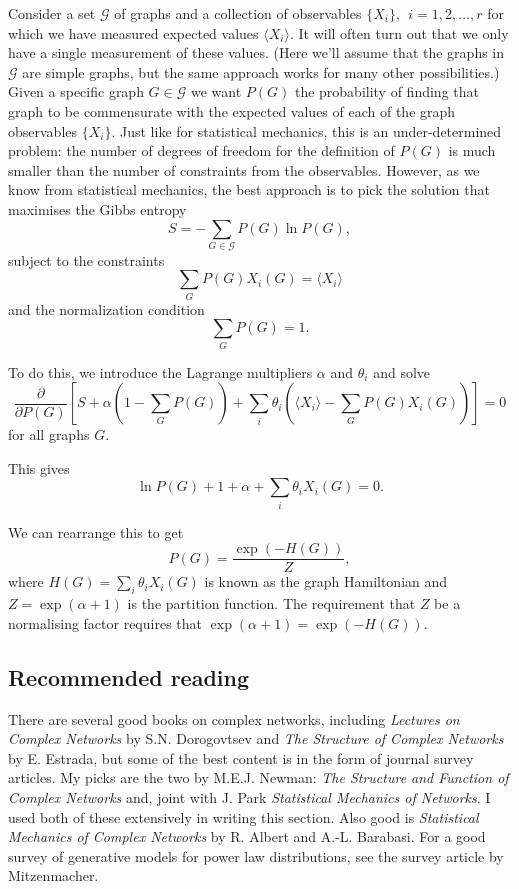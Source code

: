 Consider a set $\mathcal{G}$ of graphs and a collection of observables $\{X_i\},~~i=1,2,\ldots,r$ for which we have measured expected values $\langle X_i\rangle$. It will often turn out that we only have a single measurement of these values. (Here we'll assume that the graphs in $\mathcal{G}$ are simple graphs, but the same approach works for many other possibilities.) Given a specific graph $G\in\mathcal{G}$ we want $P(G)$ the probability of finding that graph to be commensurate with the expected values of each of the graph observables $\{X_i\}$. Just like for statistical  mechanics, this is an under-determined problem: the number of degrees of freedom for the definition of $P(G)$ is much smaller than the number of constraints from the observables. However, as we know from statistical mechanics, the best approach is to pick the solution that maximises the Gibbs entropy
$$
	S= -\sum_{G\in\mathcal{G}}P(G)\ln P(G),
$$
subject to the constraints
$$
	\sum_G P(G)X_i(G) = \langle X_i\rangle
$$
and the normalization condition
$$
	\sum_G P(G) =1.
$$

To do this, we introduce the Lagrange multipliers $\alpha$ and $\theta_i$ and solve
$$
	\frac{\partial}{\partial P(G)}\left[S + \alpha \left(1-\sum_G P(G)\right) + \sum_i \theta_i \left(\langle X_i \rangle - \sum_G P(G)X_i(G)\right) \right] = 0
$$
for all graphs $G$.

This gives
$$
	\ln P(G) +1 +\alpha +\sum_i\theta_iX_i(G) = 0.
$$

We can rearrange this to get
$$
	P(G) = \frac{\exp(-H(G))}{Z},
$$
where $H(G) = \sum_i\theta_iX_i(G)$ is known as the graph Hamiltonian and $Z = \exp(\alpha+1)$ is the partition function. The requirement that $Z$ be a normalising factor requires that $\exp(\alpha+1) = \exp(-H(G))$.


\subsection{Recommended reading}
There are several good books on complex networks, including \emph{Lectures on Complex Networks} by S.N. Dorogovtsev and \emph{The Structure of Complex Networks} by E. Estrada, but some of the best content is in the form of journal survey articles. My picks are the two by M.E.J. Newman: \emph{The Structure and Function of Complex Networks} and, joint with J. Park \emph{Statistical Mechanics of Networks}. I used both of these extensively in writing this section. Also good is \emph{Statistical Mechanics of Complex Networks} by R. Albert and A.-L. Barabasi. For a good survey of generative models for power law distributions, see the survey article by Mitzenmacher.

